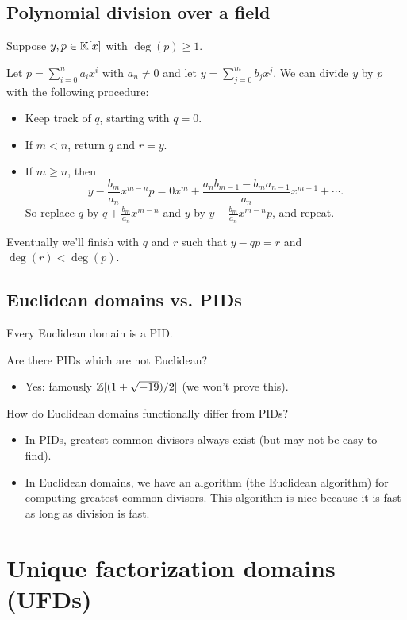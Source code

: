 \documentclass[12pt,letterpaper]{report}
\begin{document}
\pagebreak
\subsection{Polynomial division over a field}

Suppose $y, p \in \mathbb{K}[x]$ with $\deg(p) \geq 1$.

Let $p = \sum_{i = 0}^n a_i x^i$ with $a_n \neq 0$ and let $y = \sum_{j = 0}^m b_j x^j$.
We can divide $y$ by $p$ with the following procedure:
\begin{itemize}
  \item Keep track of $q$, starting with $q = 0$.
  \item If $m < n$, return $q$ and $r = y$.
  \item If $m \geq n$, then
  \[
    y - \frac{b_m}{a_n} x^{m - n} p
      = 0x^m + \frac{a_n b_{m - 1} - b_m a_{n - 1}}{a_n} x^{m - 1} + \cdots.
  \]
  So replace $q$ by $q + \frac{b_m}{a_n} x^{m - n}$ and $y$ by $y - \frac{b_m}{a_n} x^{m - n} p$,
  and repeat.
\end{itemize}
Eventually we'll finish with $q$ and $r$ such that $y - qp = r$ and $\deg(r) < \deg(p)$.

\pagebreak
\subsection{Euclidean domains vs. PIDs}

Every Euclidean domain is a PID.

Are there PIDs which are not Euclidean?
\begin{itemize}
  \item Yes: famously $\mathbb{Z}[(1 + \sqrt{-19})/2]$ (we won't prove this).
\end{itemize}

How do Euclidean domains functionally differ from PIDs?
\begin{itemize}
  \item In PIDs, greatest common divisors always exist (but may not be easy to find).
  \item In Euclidean domains, we have an algorithm (the Euclidean algorithm) for computing
    greatest common divisors.
    This algorithm is nice because it is fast as long as division is fast.
\end{itemize}

\section{Unique factorization domains (UFDs)}
\end{document}
